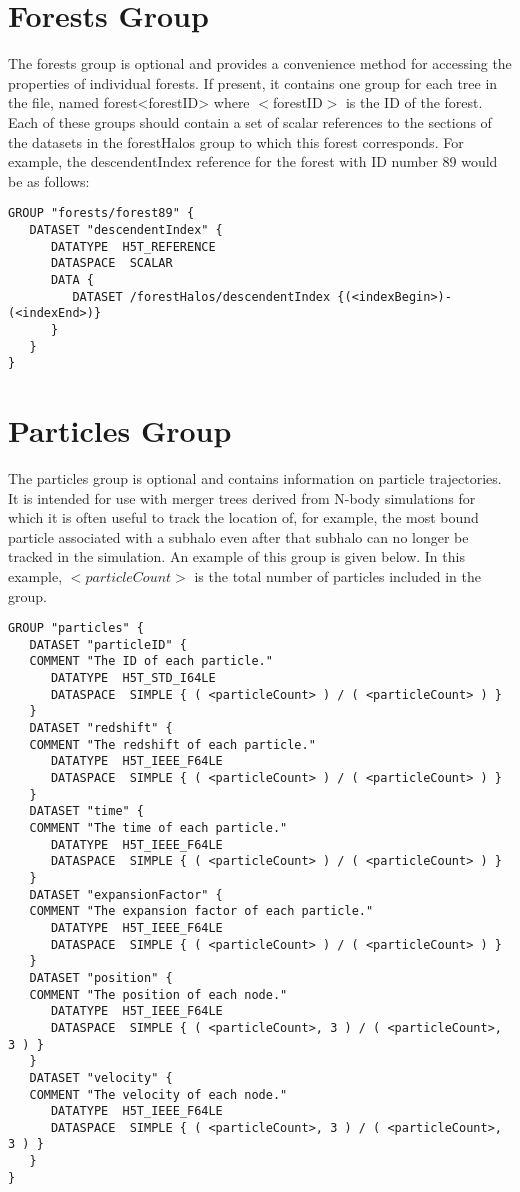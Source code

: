 \section{Forests Group}

The {\normalfont \ttfamily forests} group is optional and provides a convenience method for accessing the properties of individual forests. If present, it contains one group for each tree in the file, named {\normalfont \ttfamily forest<forestID>} where {\normalfont \ttfamily $<$forestID$>$} is the ID of the forest. Each of these groups should contain a set of scalar references to the sections of the datasets in the {\normalfont \ttfamily forestHalos} group to which this forest corresponds. For example, the {\normalfont \ttfamily descendentIndex} reference for the forest with ID number 89 would be as follows:

\begin{verbatim}
GROUP "forests/forest89" {
   DATASET "descendentIndex" {
      DATATYPE  H5T_REFERENCE
      DATASPACE  SCALAR
      DATA {
         DATASET /forestHalos/descendentIndex {(<indexBegin>)-(<indexEnd>)}
      }
   }
}
\end{verbatim}

\section{Particles Group}\label{sec:MergerTreeFormatDescription:Particles}

The {\normalfont \ttfamily particles} group is optional and contains information on particle trajectories. It is intended for use with merger trees derived from N-body simulations for which it is often useful to track the location of, for example, the most bound particle associated with a subhalo even after that subhalo can no longer be tracked in the simulation. An example of this group is given below. In this example, {\normalfont \ttfamily $<particleCount>$} is the total number of particles included in the group.

\begin{verbatim}
GROUP "particles" {
   DATASET "particleID" {
   COMMENT "The ID of each particle."
      DATATYPE  H5T_STD_I64LE
      DATASPACE  SIMPLE { ( <particleCount> ) / ( <particleCount> ) }
   }
   DATASET "redshift" {
   COMMENT "The redshift of each particle."
      DATATYPE  H5T_IEEE_F64LE
      DATASPACE  SIMPLE { ( <particleCount> ) / ( <particleCount> ) }
   }
   DATASET "time" {
   COMMENT "The time of each particle."
      DATATYPE  H5T_IEEE_F64LE
      DATASPACE  SIMPLE { ( <particleCount> ) / ( <particleCount> ) }
   }
   DATASET "expansionFactor" {
   COMMENT "The expansion factor of each particle."
      DATATYPE  H5T_IEEE_F64LE
      DATASPACE  SIMPLE { ( <particleCount> ) / ( <particleCount> ) }
   }
   DATASET "position" {
   COMMENT "The position of each node."
      DATATYPE  H5T_IEEE_F64LE
      DATASPACE  SIMPLE { ( <particleCount>, 3 ) / ( <particleCount>, 3 ) }
   }
   DATASET "velocity" {
   COMMENT "The velocity of each node."
      DATATYPE  H5T_IEEE_F64LE
      DATASPACE  SIMPLE { ( <particleCount>, 3 ) / ( <particleCount>, 3 ) }
   }
}
\end{verbatim}

